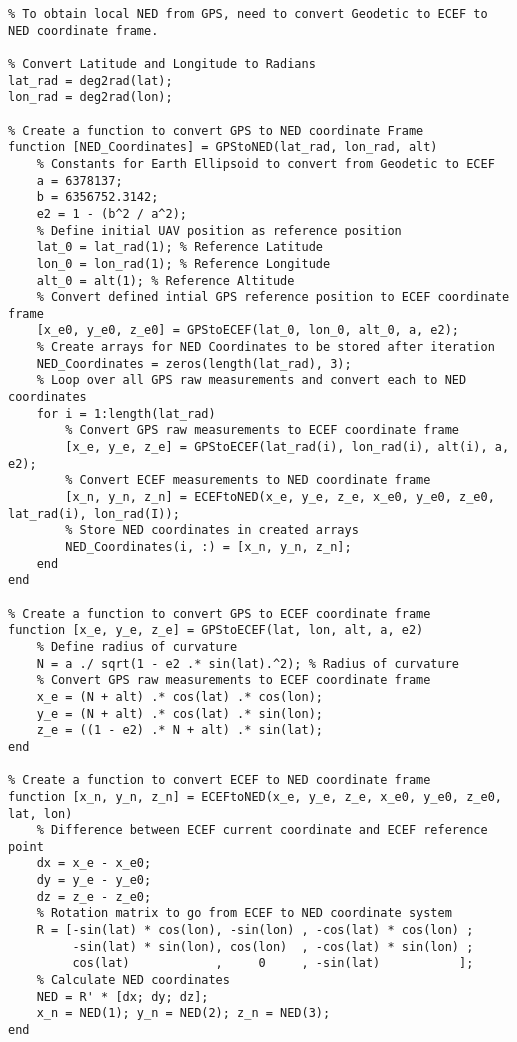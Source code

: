\begin{lstlisting}
% To obtain local NED from GPS, need to convert Geodetic to ECEF to NED coordinate frame.

% Convert Latitude and Longitude to Radians
lat_rad = deg2rad(lat);
lon_rad = deg2rad(lon);

% Create a function to convert GPS to NED coordinate Frame
function [NED_Coordinates] = GPStoNED(lat_rad, lon_rad, alt)
    % Constants for Earth Ellipsoid to convert from Geodetic to ECEF
    a = 6378137;
    b = 6356752.3142;
    e2 = 1 - (b^2 / a^2);
    % Define initial UAV position as reference position
    lat_0 = lat_rad(1); % Reference Latitude
    lon_0 = lon_rad(1); % Reference Longitude
    alt_0 = alt(1); % Reference Altitude
    % Convert defined intial GPS reference position to ECEF coordinate frame
    [x_e0, y_e0, z_e0] = GPStoECEF(lat_0, lon_0, alt_0, a, e2);
    % Create arrays for NED Coordinates to be stored after iteration
    NED_Coordinates = zeros(length(lat_rad), 3);
    % Loop over all GPS raw measurements and convert each to NED coordinates
    for i = 1:length(lat_rad)
        % Convert GPS raw measurements to ECEF coordinate frame
        [x_e, y_e, z_e] = GPStoECEF(lat_rad(i), lon_rad(i), alt(i), a, e2);
        % Convert ECEF measurements to NED coordinate frame
        [x_n, y_n, z_n] = ECEFtoNED(x_e, y_e, z_e, x_e0, y_e0, z_e0, lat_rad(i), lon_rad(I));
        % Store NED coordinates in created arrays
        NED_Coordinates(i, :) = [x_n, y_n, z_n];
    end
end

% Create a function to convert GPS to ECEF coordinate frame
function [x_e, y_e, z_e] = GPStoECEF(lat, lon, alt, a, e2)
    % Define radius of curvature
    N = a ./ sqrt(1 - e2 .* sin(lat).^2); % Radius of curvature
    % Convert GPS raw measurements to ECEF coordinate frame
    x_e = (N + alt) .* cos(lat) .* cos(lon);
    y_e = (N + alt) .* cos(lat) .* sin(lon);
    z_e = ((1 - e2) .* N + alt) .* sin(lat);
end

% Create a function to convert ECEF to NED coordinate frame
function [x_n, y_n, z_n] = ECEFtoNED(x_e, y_e, z_e, x_e0, y_e0, z_e0, lat, lon)
    % Difference between ECEF current coordinate and ECEF reference point
    dx = x_e - x_e0;
    dy = y_e - y_e0;
    dz = z_e - z_e0;
    % Rotation matrix to go from ECEF to NED coordinate system
    R = [-sin(lat) * cos(lon), -sin(lon) , -cos(lat) * cos(lon) ;
         -sin(lat) * sin(lon), cos(lon)  , -cos(lat) * sin(lon) ;
         cos(lat)            ,     0     , -sin(lat)           ];
    % Calculate NED coordinates
    NED = R' * [dx; dy; dz];
    x_n = NED(1); y_n = NED(2); z_n = NED(3);
end


\end{lstlisting}
